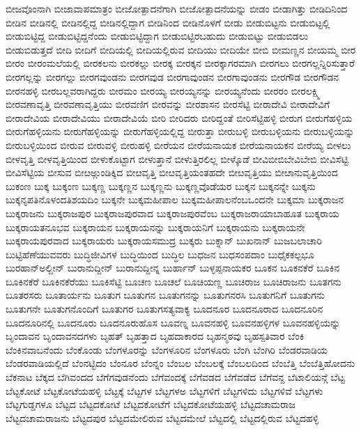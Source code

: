 {ಬೀಜವೊಂನಾಗಿ
ಬೀಜಾವಾಪಮಾತ್ರಂ
ಬೀಜೋತ್ಪಾದನೆಗಾಗಿ
ಬೀಜೋತ್ಪಾದನೆಯನ್ನು
ಬೀಡಂ
ಬೀಡಾಗಿತ್ತು
ಬೀಡಿದಿನಿಂದ
ಬೀಡಿನ
ಬೀಡಿನಲ್ಲಿ
ಬೀಡಿನಲ್ಲಿದ್ದ
ಬೀಡಿನಲ್ಲಿದ್ದಾಗ
ಬೀಡಿನಿಂದ
ಬೀಡಿನೊಳಗೆ
ಬೀಡು
ಬೀಡುಬಿಟ್ಟನು
ಬೀಡುಬಿಟ್ಟಲ್ಲಿ
ಬೀಡುಬಿಟ್ಟಿದ್ದ
ಬೀಡುಬಿಟ್ಟಿದ್ದನೆಂದು
ಬೀಡುಬಿಟ್ಟಿದ್ದಾಗ
ಬೀಡುಬಿಟ್ಟಿರಬಹುದು
ಬೀಡುಬಿಟ್ಟು
ಬೀಡುಬಿಡಲು
ಬೀಡುಬಿಡುತ್ತದೆ
ಬೀದಿ
ಬೀದಿಗೆ
ಬೀದಿಯಲ್ಲಿ
ಬೀದಿಯಲ್ಲಿರುವ
ಬೀದಿಯು
ಬೀದಿಯೇ
ಬೀಬಿ
ಬೀಮಣ್ಣನ
ಬೀಯಮ್ಮ
ಬೀರ
ಬೀರಂ
ಬೀರಂಮಲೆಯಲ್ಲಿ
ಬೀರಕಲನು
ಬೀರಕಲ್ಲು
ಬೀರಕ್ಕ
ಬೀರಕ್ಕನ
ಬೀರಕ್ಕಾಗರಮಾಗಿ
ಬೀರಗಲು
ಬೀರಗಲ್ಲನ್ನಿರಿಸುತ್ತಾರೆ
ಬೀರಗಲ್ಲನ್ನು
ಬೀರಗಲ್ಲು
ಬೀರಗವುಂಡನು
ಬೀರಗವುಡ
ಬೀರಗಾವುಂಡನ
ಬೀರಗಾವುಂಡನು
ಬೀರಗೌಡ
ಬೀರಗೌಡನ
ಬೀರನಹಳ್ಳಿ
ಬೀರಬಲ್ಲವರಾಗಿದ್ದರು
ಬೀರಮಂ
ಬೀರಯ್ಯ
ಬೀರಯ್ಯನನ್ನು
ಬೀರಯ್ಯನೆಂದು
ಬೀರರಂ
ಬೀರಲಕ್ಷ್ಮಿ
ಬೀರವಣಾವೃತ್ತಿ
ಬೀರವಣಾವೃತ್ತಿಯು
ಬೀರವಣಿಗ
ಬೀರವನ್ನು
ಬೀರಶಾಸನ
ಬೀರಸೆಟ್ಟಿ
ಬೀರಾದೇವಿ
ಬೀರಾದೇವಿಗೆ
ಬೀರಾದೇವಿಯ
ಬೀರಾದೇವಿಯು
ಬೀರಾದೇವಿಯೆ
ಬೀರಿ
ಬೀರಿದರು
ಬೀರಿದ್ದಂತೆ
ಬೀರಿಸೆಟ್ಟಿಹಳ್ಳಿ
ಬೀರುಗ
ಬೀರುಗೆಹಳ್ಳಿಯ
ಬೀರುಗೆಹಳ್ಳಿಯನು
ಬೀರುಗೆಹಳ್ಳಿಯನ್ನು
ಬೀರುಗೆಹಳ್ಳಿಯಲ್ಲಿದ್ದ
ಬೀರುತ್ತಾ
ಬೀರುಬಳ್ಳಿ
ಬೀರುಬಳ್ಳಿಯನು
ಬೀರುಬಳ್ಳಿಯನ್ನು
ಬೀರುಬಳ್ಳಿಯಿಂದ
ಬೀರುವ
ಬೀರುವಳ್ಳಿ
ಬೀರುಹಳ್ಳಿ
ಬೀರೆಯನ
ಬೀರೆಯನಾಯಕ
ಬೀರೆಯನಾಯಕನ
ಬೀರೆಯ್ಯ
ಬೀಳಲು
ಬೀಳವೃತ್ತಿ
ಬೀಳವೃತ್ತಿಯಿಂದ
ಬೀಳುಕೊಟ್ಟಾಗ
ಬೀಳುತ್ತಾನೆ
ಬೀಳುತ್ತಿರಲಿಲ್ಲ
ಬೀಳ್ಕೊಡೆ
ಬೀವಿಬೀಬಿಬೇವಿಬೇಬಿ
ಬೀವಿಸೆಟ್ಟಿ
ಬೀವಿಸೆಟ್ಟಿಯ
ಬೀಸುವ
ಬೀೞಅ್ಗುಂಡಿಕ್ಕಿದ
ಬೀೞವೃತ್ತಿ
ಬೀೞವೃತ್ತಿಯಂತಹದೇ
ಬೀೞವೃತ್ತಿಯು
ಬೀೞಾನುವೃತ್ತಿಯಿಂದ
ಬುಕಂಣ
ಬುಕ್ಕ
ಬುಕ್ಕಂಣ
ಬುಕ್ಕಣ್ಣ
ಬುಕ್ಕಣ್ಣನ
ಬುಕ್ಕಣ್ಣನು
ಬುಕ್ಕಣ್ಣವೊಡೆಯರ
ಬುಕ್ಕನ
ಬುಕ್ಕನನ್ನೇ
ಬುಕ್ಕನು
ಬುಕ್ಕನೃಪತಿನೊಳಂದತಿಶಯದಿಂ
ಬುಕ್ಕನೇ
ಬುಕ್ಕಮಹೀಪಾಲ
ಬುಕ್ಕಮಹೀಪಾಲನೆಂಬಒಂದನೇ
ಬುಕ್ಕಮಾ
ಬುಕ್ಕರಾಜನ
ಬುಕ್ಕರಾಜನು
ಬುಕ್ಕರಾಜಪುರ
ಬುಕ್ಕರಾಜಪುರವಾದ
ಬುಕ್ಕರಾಜಪುರವೆಂಬ
ಬುಕ್ಕರಾಜರಾಯಾಬಾಹೂತ
ಬುಕ್ಕರಾಯ
ಬುಕ್ಕರಾಯತನೂಭವ
ಬುಕ್ಕರಾಯನ
ಬುಕ್ಕರಾಯನನ್ನು
ಬುಕ್ಕರಾಯನಿಗೆ
ಬುಕ್ಕರಾಯನು
ಬುಕ್ಕರಾಯನೇ
ಬುಕ್ಕರಾಯಪುರವಾದ
ಬುಕ್ಕರಾಯರು
ಬುಕ್ಕರಾಯಸಮುದ್ರ
ಬುಕ್ಕರು
ಬುಕ್ನಾನ್
ಬುಖನಾನ್
ಬುಜಬಲಾಚಾರಿ
ಬುಟ್ಟಿಹೆಣೆಯುವವರು
ಬುದ್ಧಿಜೀವಿಗಳ
ಬುದ್ಧಿಯಿಂದ
ಬುದ್ಧಿಲ
ಬುಧಜನ
ಬುಧಸಂಪದಾಂ
ಬುಧೈಕಕಲ್ಪಭೂ
ಬುರಹಾನ್ಅಲ್ದೀನ್
ಬುರಾನುದ್ದೀನ್
ಬುರಾನುದ್ದೀನ್ನ
ಬುರ್ಹಾನ್
ಬುಳ್ಳಪ್ಪನಾಯಕರ
ಬೂಕನ
ಬೂಕನಕೆರೆ
ಬೂಕಿನ
ಬೂಕಿನಕೆರೆ
ಬೂಕಿನಕೆರೆಯು
ಬೂಕಿಸೆಟ್ಟಿ
ಬೂಚಣ
ಬೂಚಲೆ
ಬೂಚಿಯಣ್ಣ
ಬೂಚಿರಾಜ
ಬೂಚಿರಾಜನು
ಬೂತಗನು
ಬೂತರಸರು
ಬೂತಾರ್ಯನು
ಬೂತುಗ
ಬೂತುಗನ
ಬೂತುಗನನ್ನು
ಬೂತುಗನರಸಿ
ಬೂತುಗನಿಗೆ
ಬೂತುಗನು
ಬೂತುಗನೇ
ಬೂತುಗನೊಂದಿಗೆ
ಬೂತುಗರ
ಬೂತುಗಸತ್ಯವಾಕ್ಯ
ಬೂದನೂರ
ಬೂದನೂರಾದ
ಬೂದನೂರಿನ
ಬೂದನೂರಿನಲ್ಲಿ
ಬೂದನೂರು
ಬೂದನೂರುಹೊಸ
ಬೂವಣ್ನ
ಬೂವನಹಳ್ಳಿ
ಬೂವನಹಳ್ಳಿಗಳ
ಬೂವನಹಳ್ಳಿಯನ್ನು
ಬೃಂದಾವನ
ಬೃಂದಾವನದಗಳು
ಬೃಹತ್
ಬೃಹತ್ತಾದ
ಬೃಹದಾಕಾರದ
ಬೃಹನ್ಮಠವು
ಬೃಹಸ್ಪತಿವಾರ
ಬೆಂಕಿ
ಬೆಂಕಿನವಾಬನೆಂದು
ಬೆಂಕೊಂಡು
ಬೆಂಗಳೂರನ್ನು
ಬೆಂಗಳೂರಿನ
ಬೆಂಗಳೂರು
ಬೆಂಗಿ
ಬೆಂಗಿರಿ
ಬೆಂಡರವಾಡಿಯ
ಬೆಂಡರವಾಡಿಯಲ್ಲಿದೆ
ಬೆಂನಟ್ಟಿದಂ
ಬೆಂನೂರ
ಬೆಂನ್ನಂ
ಬೆಂಬಲ
ಬೆಂಬಲಕ್ಕೆ
ಬೆಂಬಲದಿಂದ
ಬೆಂಬೆತ್ತಿ
ಬೆಂಬೆತ್ತಿಹೋದನು
ಬೆಕನಾಟ
ಬೆಕ್ಕದ
ಬೆಗಿವಂದದ
ಬೆಗೆಗವುಡನೆಂದು
ಬೆಗೆವಂದಕ್ಕೆ
ಬೆಗೆವಡದ
ಬೆಗೆವಡೆದ
ಬೆಗೆವನ್ದ
ಬೆಟಾಲಿಯನ್ಗೆ
ಬೆಟ್ಟ
ಬೆಟ್ಟಕೋಟೆ
ಬೆಟ್ಟಕೋಟೆಯಹಳ್ಳಿ
ಬೆಟ್ಟಕ್ಕೆ
ಬೆಟ್ಟಗಳ
ಬೆಟ್ಟಗಳಅ
ಬೆಟ್ಟಗಳಿಗೆ
ಬೆಟ್ಟಗಳಿದು
ಬೆಟ್ಟಗಳಿವೆ
ಬೆಟ್ಟಗಳು
ಬೆಟ್ಟಗುಡ್ಡಗಳೂ
ಬೆಟ್ಟದ
ಬೆಟ್ಟದಕೋಟೆ
ಬೆಟ್ಟದಕೋಟೆಗೆ
ಬೆಟ್ಟದಕೋಟೆಯಹಳ್ಳಿ
ಬೆಟ್ಟದಚಾಮರಾಜ
ಬೆಟ್ಟದಚಾಮರಾಜನು
ಬೆಟ್ಟದಪುರ
ಬೆಟ್ಟದಮೇಲಿರುವ
ಬೆಟ್ಟದಮೇಲೆ
ಬೆಟ್ಟದಲ್ಲಿ
ಬೆಟ್ಟದಲ್ಲಿರುವ
ಬೆಟ್ಟದಹಳ್ಳಿ
}
